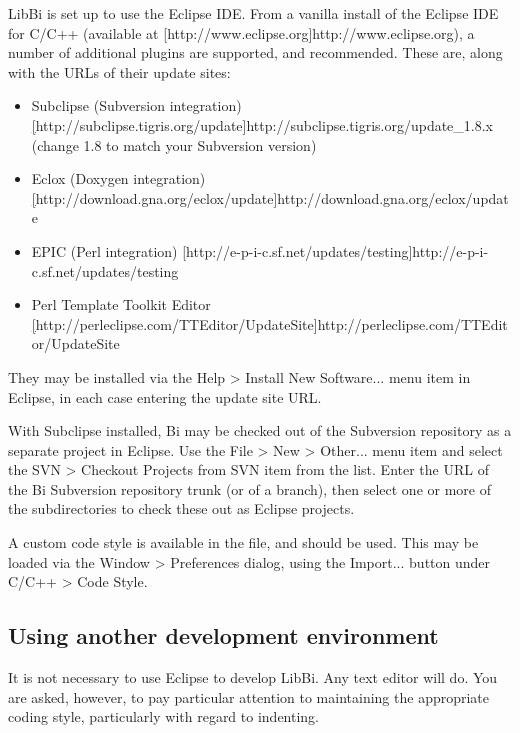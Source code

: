 LibBi is set up to use the Eclipse IDE. From a vanilla install of the Eclipse
IDE for C/C++ (available at
\hyperref[hyper][http://www.eclipse.org]{http://www.eclipse.org}), a number of
additional plugins are supported, and recommended. These are, along with the
URLs of their update sites:
\begin{itemize}
\item Subclipse (Subversion integration)
  \hyperref[hyper][http://subclipse.tigris.org/update]{http://subclipse.tigris.org/update\_1.8.x}
  (change 1.8 to match your Subversion version)

\item Eclox (Doxygen integration) \hyperref[hyper][http://download.gna.org/eclox/update]{http://download.gna.org/eclox/update}

\item EPIC (Perl integration) \hyperref[hyper][http://e-p-i-c.sf.net/updates/testing]{http://e-p-i-c.sf.net/updates/testing}

\item Perl Template Toolkit Editor \hyperref[hyper][http://perleclipse.com/TTEditor/UpdateSite]{http://perleclipse.com/TTEditor/UpdateSite}
\end{itemize}
They may be installed via the \textsf{Help > Install New Software...} menu
item in Eclipse, in each case entering the update site URL.

With Subclipse installed, Bi may be checked out of the Subversion repository
as a separate project in Eclipse. Use the \textsf{File > New > Other...} menu
item and select the \textsf{SVN > Checkout Projects from SVN} item from the
list. Enter the URL of the Bi Subversion repository trunk (or of a branch),
then select one or more of the subdirectories to check these out as Eclipse
projects.

 A custom code style is available in the
 file, and should be used. This may be loaded
via the \textsf{Window > Preferences} dialog, using the \textsf{Import...}
button under \textsf{C/C++ > Code Style}.

\subsection{Using another development environment}

It is not necessary to use Eclipse to develop LibBi. Any text editor will
do. You are asked, however, to pay particular attention to maintaining the
appropriate coding style, particularly with regard to
indenting.

